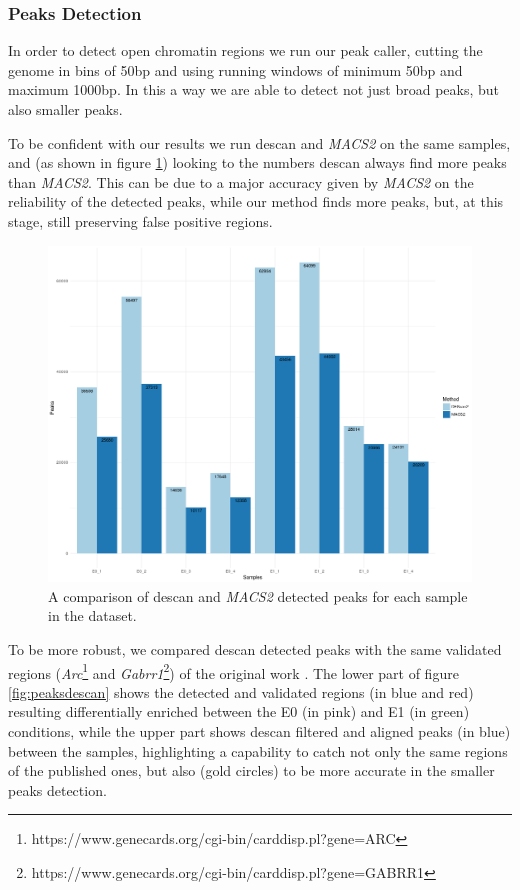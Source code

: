 \subsubsection{Peaks Detection}

In order to detect open chromatin regions we run our peak caller, cutting the genome in bins of 50bp and using running windows of minimum 50bp and maximum 1000bp.
In this a way we are able to detect not just broad peaks, but also smaller peaks.

To be confident with our results we run \gls{descan} and \textit{MACS2}  \cite{Zhang2008} on the same samples, and (as shown in figure \ref{fig:des2m2peaks}) looking to the numbers \gls{descan} always find more peaks than \textit{MACS2}.
This can be due to a major accuracy given by \textit{MACS2} on the reliability of the detected peaks, while our method finds more peaks, but, at this stage, still preserving false positive regions.

\begin{figure}[H]
\includegraphics[width=\textwidth, keepaspectratio]{img/descan2/d2m2_peaks_number.png}
\caption[The \gls{descan} and \textit{MACS2} peaks detection]{A comparison of \gls{descan} and \textit{MACS2} detected peaks for each sample in the dataset.}
\label{fig:des2m2peaks}
\centering
\end{figure}

To be more robust, we compared \gls{descan} detected peaks with the same validated regions (\textit{Arc}\footnote{https://www.genecards.org/cgi-bin/carddisp.pl?gene=ARC} and \textit{Gabrr1}\footnote{https://www.genecards.org/cgi-bin/carddisp.pl?gene=GABRR1}) of the original work \cite{Su2017}.
The lower part of figure \ref{fig:peaksdescan} shows the detected and validated regions (in blue and red) resulting differentially enriched between the E0 (in pink) and E1 (in green) conditions, while the upper part shows \gls{descan} filtered and aligned peaks (in blue) between the samples, highlighting a capability to catch not only the same regions of the published ones, but also (gold circles) to be more accurate in the smaller peaks detection.

